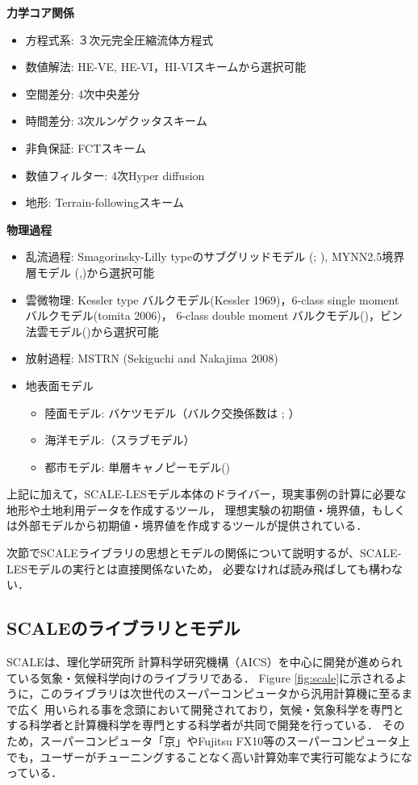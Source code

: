 {\bf 力学コア関係}

\begin{itemize}
 \item 方程式系: ３次元完全圧縮流体方程式
 \item 数値解法: HE-VE,  HE-VI，HI-VIスキームから選択可能
 \item 空間差分: 4次中央差分
 \item 時間差分: 3次ルンゲクッタスキーム
 \item 非負保証: FCTスキーム
 \item 数値フィルター: 4次Hyper diffusion
 \item 地形: Terrain-followingスキーム
\end{itemize}

{\bf 物理過程}

\begin{itemize}
 \item 乱流過程: Smagorinsky-Lilly typeのサブグリッドモデル (\cite{smagorinsky_1963}; \cite{lilly_1962}), 
MYNN2.5境界層モデル (\cite{my_1982},\cite{nakanishi_2004})から選択可能
 \item 雲微物理: Kessler type バルクモデル(Kessler 1969)，6-class single moment バルクモデル(tomita 2006)，
6-class double moment バルクモデル(\cite{sn_2014})，ビン法雲モデル(\cite{suzuki_etal_2010})から選択可能
 \item 放射過程: MSTRN (Sekiguchi and Nakajima 2008)
 \item 地表面モデル
  \begin{itemize}
   \item 陸面モデル: バケツモデル（バルク交換係数は \cite{beljaars_1991}; \cite{wilson_2001}）
   \item 海洋モデル:（スラブモデル）
   \item 都市モデル: 単層キャノピーモデル(\cite{kusaka_2001})
  \end{itemize}
\end{itemize}

上記に加えて，SCALE-LESモデル本体のドライバー，現実事例の計算に必要な地形や土地利用データを作成するツール，
理想実験の初期値・境界値，もしくは外部モデルから初期値・境界値を作成するツールが提供されている．

次節でSCALEライブラリの思想とモデルの関係について説明するが、SCALE-LESモデルの実行とは直接関係ないため，
必要なければ読み飛ばしても構わない．


\subsection{SCALEのライブラリとモデル}
SCALEは、理化学研究所 計算科学研究機構（AICS）を中心に開発が進められている気象・気候科学向けのライブラリである．
Figure \ref{fig:scale}に示されるように，このライブラリは次世代のスーパーコンピュータから汎用計算機に至るまで広く
用いられる事を念頭において開発されており，気候・気象科学を専門とする科学者と計算機科学を専門とする科学者が共同で開発を行っている．
そのため，スーパーコンピュータ「京」やFujitsu FX10等のスーパーコンピュータ上でも，ユーザーがチューニングすることなく高い計算効率で実行可能なようになっている．

